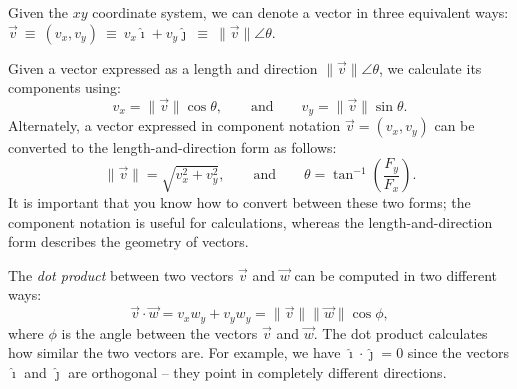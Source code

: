 \documentclass[letterpaper,9pt,journal]{IEEEtran}
\begin{document}
Given the $xy$ coordinate system, we can denote a vector in three equivalent ways:
$
  \vec{v}  
  \ \equiv \ (v_x,v_y)
  \ \equiv \  v_x\hat{\imath} + v_y\hat{\jmath} 
  \ \equiv \ 
  \|\vec{v}\| \angle \theta
$.

Given a vector expressed as a length and direction $\|\vec{v}\| \angle \theta$,
we calculate its components using:
\[
  v_x = \|\vec{v}\| \cos\theta, \qquad \text{and} \qquad   v_y = \|\vec{v}\|\sin\theta.
\]
Alternately, a vector expressed in component notation $\vec{v}=(v_x,v_y)$ 
can be converted to the length-and-direction form as follows:
\[
 \|\vec{v}\|  = \sqrt{ v_x^2 + v_y^2 }, \qquad \text{and} \qquad \theta = \tan^{-1}\!\left( \frac{ F_{y} }{ F_{x} } \right).
\]
It is important that you know how to convert between these two forms;
the component notation is useful for calculations, 
whereas the length-and-direction form describes the geometry of vectors.


The \emph{dot product} between two vectors $\vec{v}$ and $\vec{w}$ 
can be  computed in two different ways:
\[
 \vec{v}\cdot\vec{w} = v_xw_y + v_yw_y = \|\vec{v}\| \|\vec{w}\| \cos\phi,
\]
where $\phi$ is the angle between the vectors $\vec{v}$ and $\vec{w}$.
The dot product calculates how similar the two vectors are.
For example, we have $\hat{\imath} \cdot \hat{\jmath} =0$
since the vectors $\hat{\imath}$ and $\hat{\jmath}$ are orthogonal -- they point in completely different directions.
%






%
\end{document}
